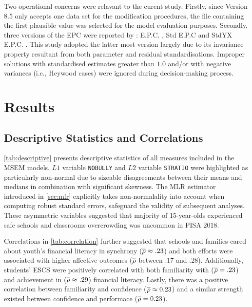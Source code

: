 \documentclass[a4paper,11pt,UKenglish,twoside,openright]{report}\usepackage[]{graphicx}\usepackage[]{color}
\begin{document}
Two operational concerns were relavant to the curent study. Firstly, since \cM Version 8.5 only accepts one data set for the modification procedures, the file containing the first plausible value was selected for the model evaluation purposes. Secondly, three versions of the EPC were reported by \CM: \textsf{E.P.C.} \parencite{saris:1987}, \textsf{Std E.P.C} \parencite{kaplan:1989} and \textsf{StdYX E.P.C.} \parencite{chou:1993}. This study adopted the latter most version largely due to its invariance property resultant from both parameter and residual standardisations. Improper solutions with standardised estimates greater than $1.0$ and/or with negative variances (i.e., Heywood cases) were ignored during decision-making process.


\chapter{Results}
\label{chp:4}



\section{Descriptive Statistics and Correlations}

\cref{tab:descriptive} presents descriptive statistics of all measures included in the MSEM models. $L1$ variable \texttt{NOBULLY} and $L2$ variable \texttt{STRATIO} were highlighted as particularly non-normal due to sizeable disagreements between their means and medians in combination with significant skewness. The MLR estimator introduced in \cref{sec:mlr} explicitly takes non-normalality into account when computing robust standard errors, safeguard the validity of subsequent analyses. These asymmetric variables suggested that majority of 15-year-olds experienced safe schools and classrooms overcrowding was uncommon in PISA 2018.

Correlations in \cref{tab:correlation} further suggested that schools and families cared about youth's financial literacy in synchrony ($\overline{\rho} \approx .23$) and both efforts were associated with higher affective outcomes ($\overline{\rho}$ between $.17$ and $.28$). Additionally, students' ESCS were positively correlated with both familiarity with ($\overline{\rho} = .23$) and achievement in ($\overline{\rho} \approx .29$) financial literacy. Lastly, there was a positive correlation between familiarity and confidence ($\overline{\rho} \approx 0.23$) and a similar strength existed between confidence and performace ($\overline{\rho} = 0.23$).
\end{document}
